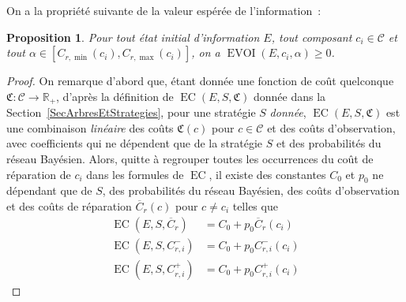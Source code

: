 \documentclass[a4paper,11pt]{article}
\theoremstyle{plain}
\newtheorem*{prop}{Proposition}
\theoremstyle{definition}
\DeclareMathOperator{\EC}{EC}
\DeclareMathOperator{\EVOI}{EVOI}
\begin{document}
On a la propriété suivante de la valeur espérée de l'information~:

\begin{prop}
Pour tout état initial d'information $E$, tout composant $c_i \in \mathcal C$ et tout $\alpha \in [C_{r, \min}(c_i),\allowbreak C_{r, \max}(c_i)]$, on a $\EVOI(E, c_i, \alpha) \geq 0$.
\end{prop}

\begin{proof}
On remarque d'abord que, étant donnée une fonction de coût quelconque $\mathfrak C: \mathcal C \to \mathbb R_+$, d'après la définition de $\EC(E, S, \mathfrak C)$ donnée dans la Section~\ref{SecArbresEtStrategies}, pour une stratégie $S$ \emph{donnée}, $\EC(E, S, \mathfrak C)$ est une combinaison \emph{linéaire} des coûts $\mathfrak C(c)$ pour $c \in \mathcal C$ et des coûts d'observation, avec coefficients qui ne dépendent que de la stratégie $S$ et des probabilités du réseau Bayésien. Alors, quitte à regrouper toutes les occurrences du coût de réparation de $c_i$ dans les formules de $\EC$, il existe des constantes $C_0$ et $p_0$ ne dépendant que de $S$, des probabilités du réseau Bayésien, des coûts d'observation et des coûts de réparation $\overline C_r(c)$ pour $c \neq c_i$ telles que
\begin{equation}
\label{EqECs}
\begin{aligned}
\EC(E, S, \overline C_r) & = C_0 + p_0 \overline C_r(c_i) \\
\EC(E, S, C_{r, i}^-) & = C_0 + p_0 C_{r, i}^-(c_i) \\
\EC(E, S, C_{r, i}^+) & = C_0 + p_0 C_{r, i}^+ (c_i)
\end{aligned}
\end{equation}


\end{proof}
\end{document}

